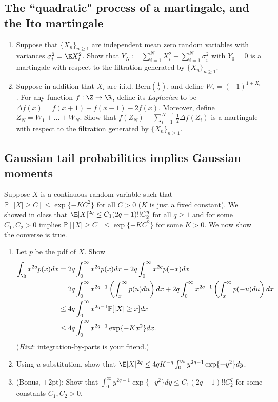 \documentclass[12pt,reqno]{amsart}
\theoremstyle{definition}
\theoremstyle{remark}
\numberwithin{equation}{section}
\begin{document}
\subsection{The ``quadratic" process of a martingale, and the Ito martingale}
\begin{enumerate}
\item Suppose that $\{X_{n}\}_{n\geq1}$ are independent mean zero random variables with variances $\sigma_{i}^{2}=\E X_{i}^{2}$. Show that $Y_{N}:=\sum_{i=1}^{N}X_{i}^{2}-\sum_{i=1}^{N}\sigma_{i}^{2}$ with $Y_{0}=0$ is a martingale with respect to the filtration generated by $\{X_{n}\}_{n\geq1}$.
\item Suppose in addition that $X_{i}$ are i.i.d. $\mathrm{Bern}(\frac12)$, and define $W_{i}=(-1)^{1+X_{i}}$. For any function $f:\Z\to\R$, define its \emph{Laplacian} to be $\Delta f(x)=f(x+1)+f(x-1)-2f(x)$. Moreover, define $Z_{N}=W_{1}+\ldots+W_{N}$. Show that $f(Z_{N})-\sum_{i=1}^{N-1}\frac12\Delta f(Z_{i})$ is a martingale with respect to the filtration generated by $\{X_{n}\}_{n\geq1}$.
\end{enumerate}
\subsection{Gaussian tail probabilities implies Gaussian moments}
Suppose $X$ is a continuous random variable such that $\mathbb{P}[|X|\geq C]\leq\exp\{-KC^{2}\}$ for all $C>0$ ($K$ is just a fixed constant). {\color{red}We showed in class that $\E|X|^{2q}\leq C_{1}(2q-1)!!C_{2}^{q}$ for all $q\geq1$ and for some $C_{1},C_{2}>0$ implies $\mathbb{P}[|X|\geq C]\leq\exp\{-KC^{2}\}$ for some $K>0$. We now show the converse is true.}
\begin{enumerate}
\item Let $p$ be the pdf of $X$. Show
%
\begin{align*}
\int_{\R}x^{2q}p(x)dx&=2q\int_{0}^{\infty}x^{2q}p(x)dx+2q\int_{0}^{\infty}x^{2q}p(-x)dx\\
&=2q\int_{0}^{\infty}x^{2q-1}\left(\int_{x}^{\infty}p(u)du\right)dx+2q\int_{0}^{\infty}x^{2q-1}\left(\int_{x}^{\infty}p(-u)du\right)dx\\
&\leq 4q\int_{0}^{\infty}x^{2q-1}\mathbb{P}[|X|\geq x]dx\\
&\leq 4q\int_{0}^{\infty}x^{2q-1}\exp\{-Kx^{2}\}dx.
\end{align*}
%
(\emph{Hint}: integration-by-parts is your friend.)
\item Using $u$-substitution, show that $\E|X|^{2q}\leq 4qK^{-q}\int_{0}^{\infty}y^{2q-1}\exp\{-y^{2}\}dy$.
\item (Bonus, +2pt): Show that $\int_{0}^{\infty}y^{2q-1}\exp\{-y^{2}\}dy\leq C_{1}(2q-1)!!C_{2}^{q}$ for some constants $C_{1},C_{2}>0$.
\end{enumerate}
\end{document}
